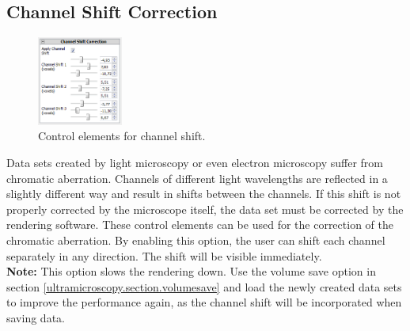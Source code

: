 \subsection{Channel Shift Correction}\label{ultramicroscopy.section.channelshift}
\begin{minipage}{\textwidth}
\begin{figure}
\vspace*{-1cm}
\centering
\includegraphics[width=0.25\textwidth]{images/channel_shift.png}
\caption{Control elements for channel shift.}
\label{ultramicroscopy.figure.channelshift}
\end{figure}
Data sets created by light microscopy or even electron microscopy suffer from chromatic aberration. Channels of different light wavelengths are reflected in
a slightly different way and result in shifts between the channels. If this shift is not properly corrected by the microscope itself, 
the data set must be corrected
by the rendering software. 
These control elements can be used for the correction of the chromatic aberration. 
By enabling this option, the user can shift each channel separately in any direction. 
The shift will be visible immediately.\\
\textbf{Note: } This option slows the rendering down. Use the volume save option in section \ref{ultramicroscopy.section.volumesave} 
and load the newly created data sets to improve the performance again, as the channel shift will be incorporated when saving data.
\end{minipage}

